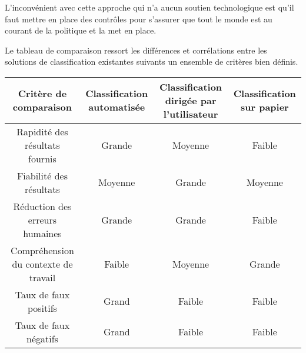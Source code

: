 L’inconvénient avec cette approche qui n’a aucun soutien technologique est qu’il faut mettre en place des contrôles pour s’assurer que tout le monde est au courant de la politique et la met en place. 

Le tableau de comparaison ressort les différences et corrélations entre les solutions de classification existantes suivants un ensemble de critères bien définis.
\begin{center}
    \begin{tabular}{c|c|c|c}
        \hline
         \textbf{Critère de comparaison} & \textbf{Classification automatisée} & \textbf{Classification dirigée par l'utilisateur} & \textbf{Classification sur papier}  \\
        \hline
         Rapidité des résultats fournis & Grande & Moyenne & Faible \\
         \hline
         Fiabilité des résultats & Moyenne & Grande & Moyenne \\
         \hline
         Réduction des erreurs humaines & Grande & Grande & Faible \\
         \hline
         Compréhension du contexte de travail & Faible & Moyenne & Grande \\
         \hline
         Taux de faux positifs & Grand & Faible & Faible \\
         \hline
         Taux de faux négatifs & Grand & Faible & Faible \\
         \hline
         
    \end{tabular}
\end{center}